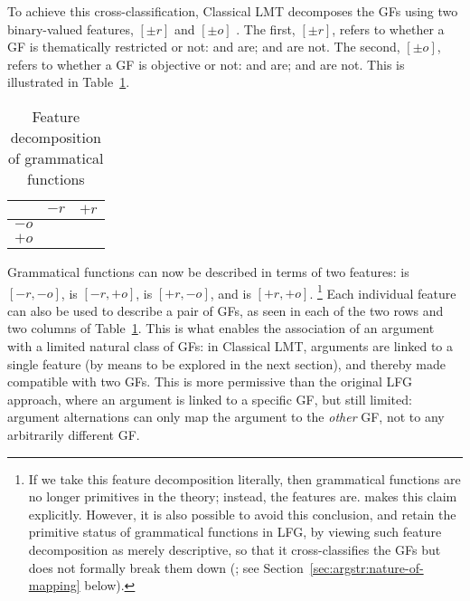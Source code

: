 \documentclass[output=paper]{langscibook}
\begin{document}
\largerpage[-1]
To achieve this cross-classification, Classical LMT decomposes the GFs using two
binary-valued features, $[\pm r]$ and $[\pm o]$
\citep[24--25]{bresnan1989locative}. The first, $[\pm r]$, refers to whether a
GF is thematically restricted or not: \OBJTHETA and \OBLTHETA are; \SUBJ and
\OBJ are not. The second, $[\pm o]$, refers to whether a GF is objective or not:
\OBJ and \OBJTHETA are; \SUBJ and \OBLTHETA are not. This is illustrated in
Table~\ref{tab:feature-decomposition}.
%
\begin{table}[t]
  \centering
  \begin{tabular}[t]{l|ll}
    &	$-r$	&	$+r$			\\
    \hline
    $-o$	&	\SUBJ	&	\OBLTHETA	\\
    $+o$	&	\OBJ	&	\OBJTHETA
  \end{tabular}%
  \caption{Feature decomposition of grammatical functions}
  \label{tab:feature-decomposition}
\end{table}
%
Grammatical functions can now be described in terms of two features: \SUBJ is
{$[-r, -o]$}, \OBJ is {$[-r, +o]$}, \OBLTHETA is {$[+r, -o]$},
and \OBJTHETA is {$[+r, +o]$}.%
%
\footnote{If we take this feature decomposition literally, then grammatical functions are no longer primitives in the theory; instead, the features are. \citet[31]{Butt1995} makes this claim explicitly. However, it is also possible to avoid this conclusion, and retain the primitive status of grammatical functions in LFG, by viewing such feature decomposition as merely descriptive, so that it cross-classifies the GFs but does not formally break them down (\citealp[298ff.]{butt1997architecture,findlay2017mapping}{}; see Section~\ref{sec:argstr:nature-of-mapping} below).}
%
Each individual feature can also be used to describe a pair of GFs, as seen in each of the two rows and two columns of Table~\ref{tab:feature-decomposition}. This is what enables the association of an argument with a limited natural class of GFs: in Classical LMT, arguments are linked to a single feature (by means to be explored in the next section), and thereby made compatible with two GFs. This is more permissive than the original LFG approach, where an argument is linked to a specific GF, but still limited: argument alternations can only map the argument to the \emph{other} GF, not to any arbitrarily different GF.
\end{document}
